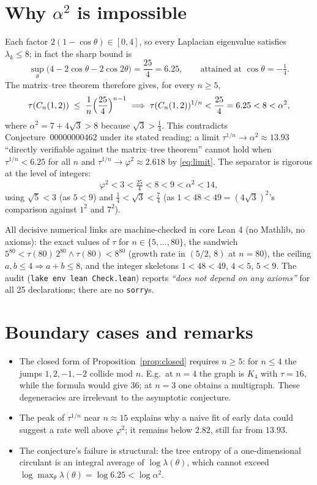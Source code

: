 \documentclass[11pt]{article}
\theoremstyle{remark}
\begin{document}
\section{Why $\alpha^2$ is impossible}

Each factor $2(1-\cos\theta) \in [0,4]$, so every Laplacian eigenvalue satisfies
$\lambda_k \le 8$; in fact the sharp bound is
\[
\sup_{\theta}\bigl(4 - 2\cos\theta - 2\cos 2\theta\bigr) = \frac{25}{4} = 6.25,
\qquad \text{attained at } \cos\theta = -\tfrac14 .
\]
The matrix--tree theorem therefore gives, for every $n \ge 5$,
\[
\tau(C_n(1,2)) \;\le\; \frac{1}{n}\Bigl(\frac{25}{4}\Bigr)^{n-1}
\;\Longrightarrow\;
\tau(C_n(1,2))^{1/n} < \frac{25}{4} = 6.25 < 8 < \alpha^2 ,
\]
where $\alpha^2 = 7 + 4\sqrt3 > 8$ because $\sqrt3 > \tfrac14$. This contradicts
Conjecture~00000000462 under its stated reading: a limit
$\tau^{1/n} \to \alpha^2 \approx 13.93$ ``directly verifiable against the
matrix--tree theorem'' cannot hold when $\tau^{1/n} < 6.25$ for all $n$ and
$\tau^{1/n} \to \varphi^2 \approx 2.618$ by \eqref{eq:limit}. The separator is
rigorous at the level of integers:
\[
\varphi^2 < 3 < \tfrac{25}{4} < 8 < 9 < \alpha^2 < 14,
\]
using $\sqrt5 < 3$ (as $5 < 9$) and $\tfrac14 < \sqrt3 < \tfrac74$ (as
$1 < 48 < 49 = (4\sqrt3)^2$'s comparison against $1^2$ and $7^2$).

All decisive numerical links are machine-checked in core Lean 4 (no Mathlib,
no axioms): the exact values of $\tau$ for $n \in \{5,\dots,80\}$, the sandwich
$5^{80} < \tau(80)\, 2^{80} \wedge \tau(80) < 8^{80}$ (growth rate in
$(5/2,\,8)$ at $n=80$), the ceiling $a,b \le 4 \Rightarrow a+b \le 8$, and the
integer skeletons $1 < 48 < 49$, $4 < 5$, $5 < 9$. The audit
(\texttt{lake env lean Check.lean}) reports \emph{``does not depend on any
axioms''} for all 25 declarations; there are no \texttt{sorry}s.

\section{Boundary cases and remarks}

\begin{itemize}
\item The closed form of Proposition~\ref{prop:closed} requires $n \ge 5$: for
$n \le 4$ the jumps $1,2,-1,-2$ collide mod $n$. E.g.\ at $n=4$ the graph is
$K_4$ with $\tau = 16$, while the formula would give $36$; at $n=3$ one obtains
a multigraph. These degeneracies are irrelevant to the asymptotic conjecture.
\item The peak of $\tau^{1/n}$ near $n \approx 15$ explains why a naive fit of
early data could suggest a rate well above $\varphi^2$; it remains below $2.82$,
still far from $13.93$.
\item The conjecture's failure is structural: the tree entropy of a
one-dimensional circulant is an integral average of $\log \lambda(\theta)$, which
cannot exceed $\log\max_\theta \lambda(\theta) = \log 6.25 < \log \alpha^2$.
\end{itemize}
\end{document}
